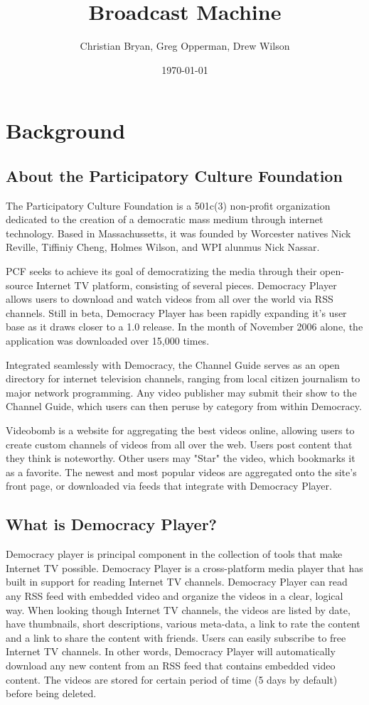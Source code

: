 \documentclass[a4paper,12pt]{report}
\author{Christian Bryan, Greg Opperman, Drew Wilson}
\date{\today}
\title{Broadcast Machine}
\begin{document}
\maketitle

\tableofcontents

\chapter{Background}

\section{About the Participatory Culture Foundation}
	The Participatory Culture Foundation is a 501c(3) non-profit organization dedicated to the creation of a democratic mass medium through internet technology. 
Based in Massachussetts, it was founded by Worcester natives Nick Reville, Tiffiniy Cheng, Holmes Wilson, and WPI alunmus Nick Nassar.

	PCF seeks to achieve its goal of democratizing the media through their open-source Internet TV platform, consisting of several pieces.  Democracy Player allows users to download and watch videos from all over the world via RSS channels. 
Still in beta, Democracy Player has been rapidly expanding it's user base as it draws closer to a 1.0 release. 
In the month of November 2006 alone, the application was downloaded over 15,000 times.

Integrated seamlessly with Democracy, the Channel Guide serves as an open directory for internet television channels, ranging from local citizen journalism to major network programming. 
Any video publisher may submit their show to the Channel Guide, which users can then peruse by category from within Democracy.

Videobomb is a website for aggregating the best videos online, allowing users to create custom channels of videos from all over the web. 
Users post content that they think is noteworthy. 
Other users may "Star" the video, which bookmarks it as a favorite. 
The newest and most popular videos are aggregated onto the site's front page, or downloaded via feeds that integrate with Democracy Player.

\section{What is Democracy Player?}
Democracy player is principal component in the collection of tools that make Internet TV possible.
Democracy Player is a cross-platform media player that has built in support for reading Internet TV channels.
Democracy Player can read any RSS feed with embedded video and organize the videos in a clear, logical way.
When looking though Internet TV channels, the videos are listed by date, have thumbnails, short descriptions, various meta-data, a link to rate the content and a link to share the content with friends.
Users can easily subscribe to free Internet TV channels.
In other words, Democracy Player will automatically download any new content from an RSS feed that contains embedded video content.
The videos are stored for certain period of time (5 days by default) before being deleted.
\end{document}
